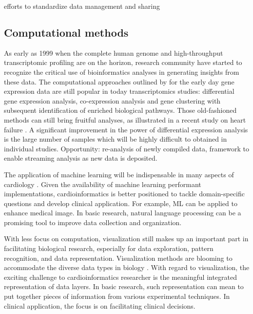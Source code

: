 \documentclass[letter]{bioinfo}
\begin{document}
efforts to standardize data management and sharing

%
%
%
%

\subsection{Computational methods}


As early as 1999 when the complete human genome and high-throughput transcriptomic profiling are on the horizon, research community have started to recognize the critical use of bioinformatics analyses in generating insights from these data. The computational approaches outlined by \cite{Claverie:1999:Computational} for the early day gene expression data are still popular in today transcriptomics studies: differential gene expression analysis, co-expression analysis and gene clustering with subsequent identification of enriched biological pathways. Those old-fashioned methods can still bring fruitful analyses, as illustrated in a recent study on heart failure \citep{Santolini:2018:personalized}. A significant improvement in the power of differential expression analysis is the large number of samples which will be highly difficult to obtained in individual studies. Opportunity: re-analysis of newly compiled data, framework to enable streaming analysis as new data is deposited.

The application of machine learning will be indispensable in many aspects of cardiology \citep{Shameer:2017:Translational,Shameer:2018:Machine}. Given the availability of machine learning performant implementations, cardioinformatics is better positioned to tackle domain-specific questions and develop clinical application. For example, ML can be applied to enhance medical image. In basic research, natural language processing can be a promising tool to improve data collection and organization.


With less focus on computation, visualization still makes up an important part in facilitating biological research, especially for data exploration, pattern recognition, and data representation. Visualization methods are blooming to accommodate the diverse data types in biology \citep{Pavlopoulos:2015:Visualizing}. With regard to visualization, the exciting challenge to cardioinformatics researcher is the meaningful integrated representation of data layers. In basic research, such representation can mean to put together pieces of information from various experimental techniques. In clinical application, the focus is on facilitating clinical decisions.
\end{document}
